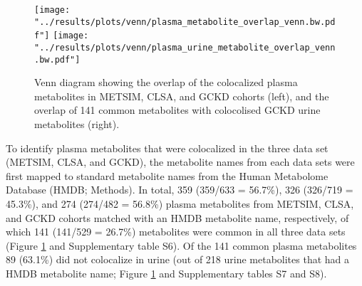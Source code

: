 \documentclass[a4paper,10pt]{article}
\begin{document}
%

\begin{figure}[h]
	\texttt{[image: "../results/plots/venn/plasma\_metabolite\_overlap\_venn.bw.pdf"]}
	\texttt{[image: "../results/plots/venn/plasma\_urine\_metabolite\_overlap\_venn.bw.pdf"]}
	\caption{Venn diagram showing the overlap of the colocalized plasma metabolites in METSIM, CLSA, and GCKD cohorts (left), and the overlap of 141 common metabolites with colocolised GCKD urine metabolites (right).}
	\label{fig:venn}
\end{figure}

To identify plasma metabolites that were colocalized in the three data set (METSIM, CLSA, and GCKD), the metabolite names from each data sets were first mapped to standard metabolite names from the Human Metabolome Database (HMDB; Methods).
In total, 359 (359/633 = 56.7\%), 326 (326/719 = 45.3\%), and 274 (274/482 = 56.8\%) plasma metabolites from METSIM, CLSA, and GCKD cohorts matched with an HMDB metabolite name, respectively, of which 141 (141/529 = 26.7\%) metabolites were common in all three data sets (Figure \ref{fig:venn} and Supplementary table S6).
Of the 141 common plasma metabolites 89 (63.1\%) did not colocalize in urine (out of 218 urine metabolites that had a HMDB metabolite name; Figure \ref{fig:venn} and Supplementary tables S7 and S8).
\\
\end{document}
